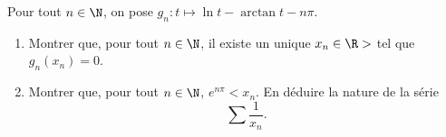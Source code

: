 \begin{enonce}
\begin{exercise}[ID={RMS135 E1449},subtitle={IMT MP 2024},tags={oraux},difficulty={}]

Pour tout $n \in \N$, on pose $g_n : t \mapsto \ln t - \arctan t - n\pi$.

\begin{enumerate}
  \item Montrer que, pour tout $n \in \N$, il existe un unique $x_n \in \R>$ tel que $g_n(x_n) = 0$.
  \item Montrer que, pour tout $n \in \N$, $e^{n\pi} < x_n$.
  En déduire la nature de la série 
  \begin{equation*}
  \sum \frac{1}{x_n}.
  \end{equation*}
\end{enumerate}

\end{exercise}
\begin{solution}
\end{solution}
\end{enonce}
